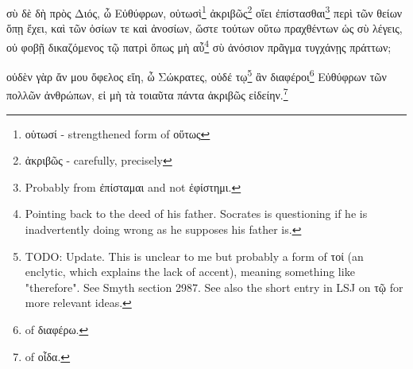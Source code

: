 σὺ
δὲ
δὴ
πρὸς
Διός,
ὦ
Εὐθύφρων,
οὑτωσὶ\footnote{οὑτωσί - strengthened form of οὕτως}
ἀκριβῶς\footnote{ἀκριβῶς - carefully, precisely}
οἴει
ἐπίστασθαι\footnote{Probably from ἐπίσταμαι and not ἐφίστημι.}
περὶ
τῶν
θείων
ὅπῃ
ἔχει,
καὶ
τῶν
ὁσίων
τε
καὶ
ἀνοσίων,
ὥστε
τούτων
οὕτω
πραχθέντων
ὡς
σὺ
λέγεις,
οὐ
φοβῇ
δικαζόμενος
τῷ
πατρὶ
ὅπως
μὴ
αὖ\footnote{Pointing back to the deed of his father. Socrates is questioning if he is inadvertently doing wrong as he supposes his father is.}
σὺ
ἀνόσιον
πρᾶγμα
τυγχάνῃς
πράττων;

οὐδὲν
γὰρ
ἄν
μου
ὄφελος
εἴη,
ὦ
Σώκρατες,
οὐδέ
\versification{[5a]}
τῳ\footnote{TODO: Update. This is unclear to me but probably a form of τοί (an enclytic, which explains the lack of accent), meaning something like "therefore". See Smyth section 2987. See also the short entry in LSJ on τῷ for more relevant ideas.}
ἂν
διαφέροι\footnote{ of διαφέρω.}
Εὐθύφρων
τῶν
πολλῶν
ἀνθρώπων,
εἰ
μὴ
τὰ
τοιαῦτα
πάντα
ἀκριβῶς
εἰδείην.\footnote{ of οἶδα.}






